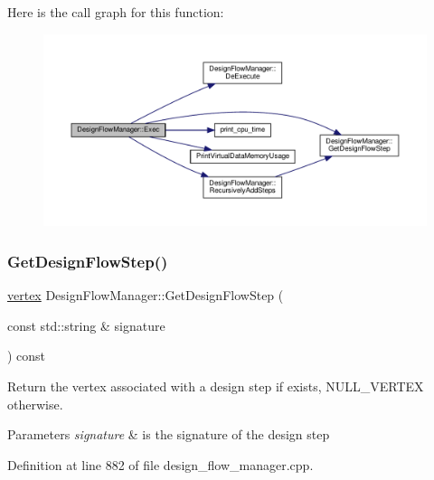 Here is the call graph for this function\+:
\nopagebreak
\begin{figure}[H]
\begin{center}
\leavevmode
\includegraphics[width=350pt]{de/d63/classDesignFlowManager_ae33babf44b5caddeafba01e7fa22bcd4_cgraph}
\end{center}
\end{figure}
\mbox{\label{classDesignFlowManager_aac97bf59eaa0aaad7c5b4e2b31d7fb55}} 
\subsubsection{\texorpdfstring{Get\+Design\+Flow\+Step()}{GetDesignFlowStep()}}
{\footnotesize\ttfamily \hyperlink{graph_8hpp_abefdcf0544e601805af44eca032cca14}{vertex} Design\+Flow\+Manager\+::\+Get\+Design\+Flow\+Step (\begin{DoxyParamCaption}\item[{const std\+::string \&}]{signature }\end{DoxyParamCaption}) const}



Return the vertex associated with a design step if exists, N\+U\+L\+L\+\_\+\+V\+E\+R\+T\+EX otherwise. 


\begin{DoxyParams}{Parameters}
{\em signature} & is the signature of the design step \\
\hline
\end{DoxyParams}


Definition at line 882 of file design\+\_\+flow\+\_\+manager.\+cpp.



